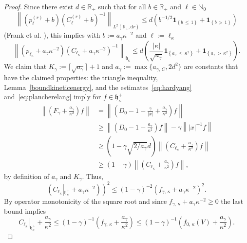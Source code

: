 \documentclass[10pt]{amsart}
\theoremstyle{definition}
\newcommand*\dr{\mathrm{d}r}
\newcommand*\nz{\mathbb{N}}
\newcommand*\rz{\mathbb{R}}
\newcommand{\one}{\mathbf{1}}
\newcommand*\gh{\mathfrak{h}}
\newcommand*\ghpk{{\gh^+_\kappa}}
\begin{document}
\begin{proof}
Since there exist $d\in\rz_+$ such that for all $b\in\rz_+$ and $\ell\in\nz_0$
\[
\left\|\left(p_\ell^{(r)}+b\right)\left(C_\ell^{(r)}+b\right)^{-1}\right\|_{L^2\left(\rz_+,\dr\right)}
\leq d\left(b^{-1/2}\one_{\left\{b\,\leq\,1\right\}} + \one_{\left\{b\,>\,1\right\}}\right)
\]
(Frank et al. \cite[Formula~(5.7)]{Franketal2020P}), this implies with $b:=a_\gamma\kappa^{-2}$ and $\ell:=\ell_\kappa$
\begin{equation}\label{eq:plancherelang}
\left\|\left(p_{\ell_\kappa}+a_\gamma \kappa^{-2}\right)\left(C_{\ell_\kappa}+a_\gamma
\kappa^{-2}\right)^{-1}\right\|_{\gh_{\kappa}} \leq d\left(\frac{|\kappa|}{\sqrt{a_\gamma}}\one_{\left\{a_\gamma\,\leq\,
\kappa^2\right\}} + \one_{\left\{a_\gamma\,>\,\kappa^2\right\}}\right).
\end{equation}
We claim that $K_\gamma:=\lceil \sqrt{a_\gamma}\rceil+1$ and $a_\gamma:=\max\{a_{\gamma,\,C},2d^2\}$ are constants that have the claimed properties: the triangle inequality, Lemma~\ref{boundkineticenergy}, and the estimates~\eqref{eq:hardyang} and~\eqref{eq:plancherelang} imply for $f\in\ghpk$
\begin{equation}\label{eq:dcc}
\begin{split}
\left\|\left(F_\gamma+\frac{a_\gamma}{\kappa^2}\right)f\right\| &=
\left\|\left(D_0-1-\frac\gamma{|x|}+\frac{a_\gamma}{\kappa^2}\right)f\right\|\\
&\geq \left\|\left(D_0-1+\frac{a_\gamma}{\kappa^2}\right)f\right\|-\gamma\left\||x|^{-1}f\right\|\\
&\geq \left(1-\gamma\sqrt{2/a_\gamma}d\right)
\left\|\left(C_{\ell_\kappa}+\frac{a_\gamma}{\kappa^2}\right)f\right\|\\
&\geq (1-\gamma)
\left\|\left(C_{\ell_\kappa}+\frac{a_\gamma}{\kappa^2}\right) f\right\|,
\end{split}
\end{equation}
by definition of $a_\gamma$ and $K_\gamma$. Thus,
\[
\left(C_{\ell_\kappa}\left|_\ghpk+a_\gamma \kappa^{-2}\right)\right)^2
\leq (1-\gamma)^{-2}\left(f_{\gamma,\,\kappa}+a_\gamma \kappa^{-2}\right)^2.
\]
By operator monotonicity of the square root and since $f_{\gamma,\,\kappa}+a_\gamma \kappa^{-2}\geq0$ the last bound implies
\begin{equation}\label{eq:boundChandraDirac}
\left.C_{\ell_\kappa}\right|_\ghpk+\frac{a_\gamma}{\kappa^2}\leq (1-\gamma)^{-1}\left(f_{\gamma,\,\kappa}+\frac{a_\gamma}{\kappa^2}\right)\leq (1-\gamma)^{-1}\left(f_{0,\,\kappa}(V)+\frac{a_\gamma}{\kappa^2}\right).
\end{equation}

\end{proof}
\end{document}
